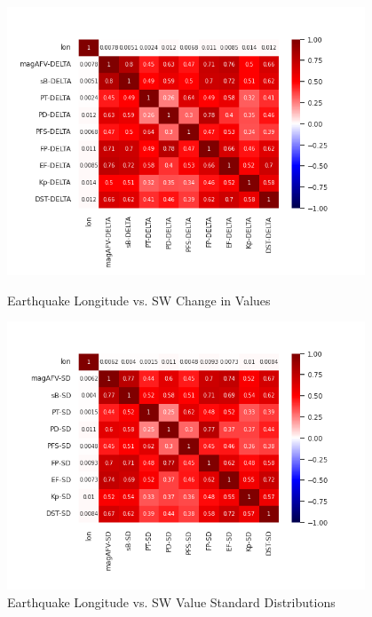 \documentclass[12pt]{article}
\begin{document}
\begin{figure}
\centering
  \includegraphics[width=0.95\textwidth]{corr-lon-DELTA.png}
  \caption{Earthquake Longitude vs. SW Change in Values}

  \includegraphics[width=0.95\textwidth]{corr-lon-SD.png}
  \caption{Earthquake Longitude vs. SW Value Standard Distributions}

\end{figure}

\newpage
\end{document}
